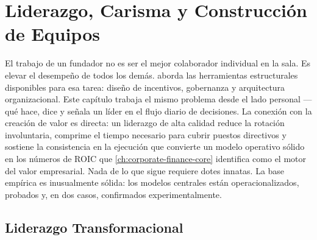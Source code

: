 \chapter{Liderazgo, Carisma y Construcción de Equipos}\label{ch:leadership-charisma}


El trabajo de un fundador no es ser el mejor colaborador individual en la sala. Es elevar el
desempeño de todos los demás.  aborda las herramientas
estructurales disponibles para esa tarea: diseño de incentivos, gobernanza y arquitectura
organizacional. Este capítulo trabaja el mismo problema desde el lado personal --- qué hace, dice
y señala un líder en el flujo diario de decisiones. La conexión con la creación de valor es
directa: un liderazgo de alta calidad reduce la rotación involuntaria, comprime el tiempo
necesario para cubrir puestos directivos y sostiene la consistencia en la ejecución que convierte
un modelo operativo sólido en los números de ROIC que \cref{ch:corporate-finance-core} identifica
como el motor del valor empresarial. Nada de lo que sigue requiere dotes innatas. La base
empírica es inusualmente sólida: los modelos centrales están operacionalizados, probados y, en
dos casos, confirmados experimentalmente.

\section{Liderazgo Transformacional}\label{sec:transformational-leadership}

